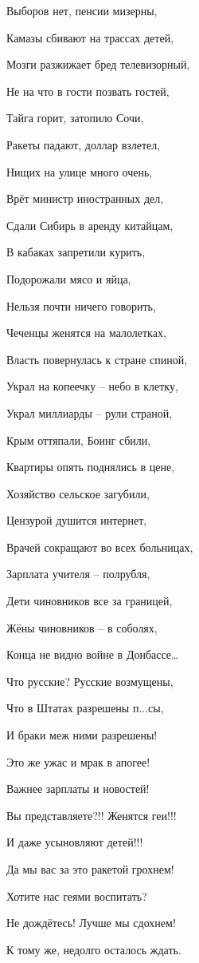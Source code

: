 Выборов нет,
пенсии мизерны,

Камазы сбивают на
трассах детей,

Мозги разжижает
бред телевизорный,

Не на что в гости
позвать гостей,

Тайга горит,
затопило Сочи,

Ракеты падают,
доллар взлетел,

Нищих на улице
много очень,

Врёт министр
иностранных дел,

Сдали Сибирь в
аренду китайцам,

В кабаках
запретили курить,

Подорожали мясо и
яйца,

Нельзя почти
ничего говорить,

Чеченцы женятся
на малолетках,

Власть
повернулась к стране спиной,

Украл на копеечку
– небо в клетку,

Украл миллиарды –
рули страной,

Крым оттяпали,
Боинг сбили,

Квартиры опять
поднялись в цене,

Хозяйство
сельское загубили,

Цензурой душится
интернет,

Врачей сокращают
во всех больницах,

Зарплата учителя
– полрубля,

Дети чиновников
все за границей,

Жёны чиновников –
в соболях,

Конца не видно
войне в Донбассе…

Что русские?
Русские возмущены,

Что в Штатах
разрешены п...сы,

И браки меж ними
разрешены!

Это же ужас и
мрак в апогее!

Важнее зарплаты и
новостей!

Вы
представляете?!! Женятся геи!!!

И даже усыновляют
детей!!!

Да мы вас за это
ракетой грохнем!

Хотите нас геями
воспитать?

Не дождётесь!
Лучше мы сдохнем!

К тому же,
недолго осталось ждать.

